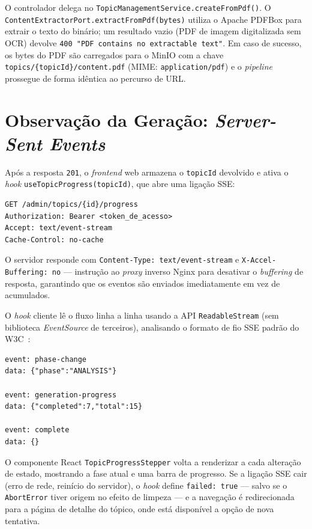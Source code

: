 O controlador delega no \texttt{TopicManagementService.createFromPdf()}.
O \texttt{ContentExtractorPort.extractFromPdf(bytes)} utiliza o Apache
PDFBox para extrair o texto do binário; um resultado vazio (PDF de imagem
digitalizada sem OCR) devolve \texttt{400 "PDF contains no extractable
text"}.
Em caso de sucesso, os bytes do PDF são carregados para o MinIO com a
chave \texttt{topics/\{topicId\}/content.pdf} (MIME:
\texttt{application/pdf}) e o \textit{pipeline} prossegue de forma
idêntica ao percurso de URL.

\section{Observação da Geração: \textit{Server-Sent Events}}
\label{sec:sse_deepdive}

Após a resposta \texttt{201}, o \textit{frontend} web armazena o
\texttt{topicId} devolvido e ativa o \textit{hook}
\texttt{useTopicProgress(topicId)}, que abre uma ligação SSE:

\begin{verbatim}
GET /admin/topics/{id}/progress
Authorization: Bearer <token_de_acesso>
Accept: text/event-stream
Cache-Control: no-cache
\end{verbatim}

O servidor responde com \texttt{Content-Type: text/event-stream} e
\texttt{X-Accel-Buffering: no} — instrução ao \textit{proxy} inverso
Nginx para desativar o \textit{buffering} de resposta, garantindo que os
eventos são enviados imediatamente em vez de acumulados.

O \textit{hook} cliente lê o fluxo linha a linha usando a API
\texttt{ReadableStream} (sem biblioteca \textit{EventSource} de terceiros),
analisando o formato de fio SSE padrão do W3C~\cite{w3c2021sse}:

\begin{verbatim}
event: phase-change
data: {"phase":"ANALYSIS"}

event: generation-progress
data: {"completed":7,"total":15}

event: complete
data: {}
\end{verbatim}

O componente React \texttt{TopicProgressStepper} volta a renderizar a cada
alteração de estado, mostrando a fase atual e uma barra de progresso.
Se a ligação SSE cair (erro de rede, reinício do servidor), o \textit{hook}
define \texttt{failed: true} — salvo se o \texttt{AbortError} tiver origem
no efeito de limpeza — e a navegação é redirecionada para a página de
detalhe do tópico, onde está disponível a opção de nova tentativa.

